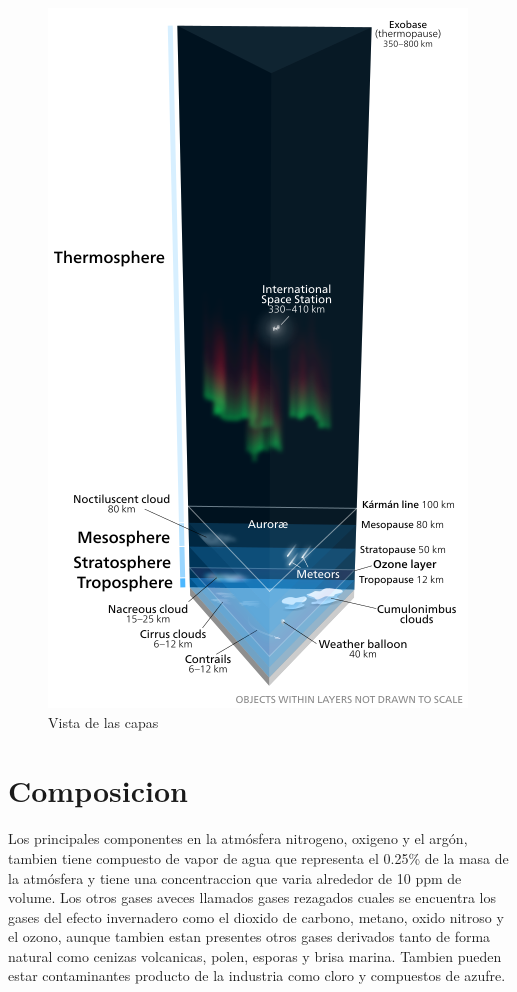 \documentclass{article}
\begin{document}
\begin{figure}
  \includegraphics[width=\linewidth]{caps.png}
  \caption{Vista de las capas}
  \label{fig:boat1}
\end{figure}
\section{Composicion}
Los principales componentes en la atmósfera nitrogeno, oxigeno y el argón, tambien tiene compuesto de vapor de agua que representa el 0.25\% de la masa de la atmósfera y tiene una concentraccion que varia alrededor de 10 ppm de volume. Los otros gases aveces llamados gases rezagados cuales se encuentra los gases del efecto invernadero como el dioxido de carbono, metano, oxido nitroso y el ozono, aunque tambien estan presentes otros gases derivados tanto de forma natural como cenizas volcanicas, polen, esporas y brisa marina. Tambien pueden estar contaminantes producto de la industria como cloro y compuestos de azufre.
\end{document}
